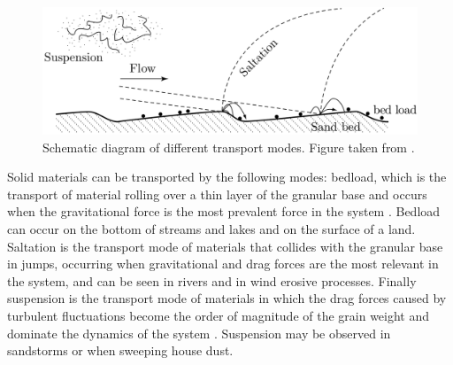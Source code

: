 \begin{figure}
    \centering
    \includegraphics[width = 0.75 \textwidth]{04-figuras/TransportModes.png}
    \caption[Transport modes.]{Schematic diagram of different transport modes. Figure taken from \cite{Granular_Media_Between_Fluid_and_Solid}.}
    \label{fig:transport_mode}
\end{figure}


    Solid materials can be transported by the following modes: bedload, which is the transport of material rolling over a thin layer of the granular base and occurs when the gravitational force is the most prevalent force in the system \cite{Bedforms_in_a_turbulent_stream}. Bedload can occur on the bottom of streams and lakes and on the surface of a land. Saltation is the transport mode of materials that collides with the granular base in jumps, occurring when gravitational and drag forces are the most relevant in the system, and can be seen in rivers and in wind erosive processes. Finally suspension is the transport mode of materials in which the drag forces caused by turbulent fluctuations become the order of magnitude of the grain weight and dominate the dynamics of the system \cite{FVSCS}. Suspension may be observed in sandstorms or when sweeping house dust. 

